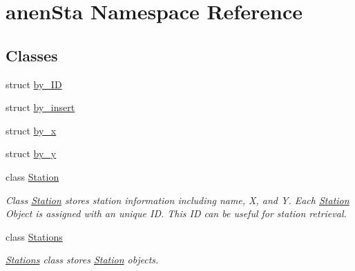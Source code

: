 \hypertarget{namespaceanen_sta}{}\section{anen\+Sta Namespace Reference}
\label{namespaceanen_sta}
\subsection*{Classes}
\begin{DoxyCompactItemize}
\item 
struct \mbox{\hyperlink{structanen_sta_1_1by___i_d}{by\+\_\+\+ID}}
\item 
struct \mbox{\hyperlink{structanen_sta_1_1by__insert}{by\+\_\+insert}}
\item 
struct \mbox{\hyperlink{structanen_sta_1_1by__x}{by\+\_\+x}}
\item 
struct \mbox{\hyperlink{structanen_sta_1_1by__y}{by\+\_\+y}}
\item 
class \mbox{\hyperlink{classanen_sta_1_1_station}{Station}}
\begin{DoxyCompactList}\small\item\em Class \mbox{\hyperlink{classanen_sta_1_1_station}{Station}} stores station information including name, X, and Y. Each \mbox{\hyperlink{classanen_sta_1_1_station}{Station}} Object is assigned with an unique ID. This ID can be useful for station retrieval. \end{DoxyCompactList}\item 
class \mbox{\hyperlink{classanen_sta_1_1_stations}{Stations}}
\begin{DoxyCompactList}\small\item\em \mbox{\hyperlink{classanen_sta_1_1_stations}{Stations}} class stores \mbox{\hyperlink{classanen_sta_1_1_station}{Station}} objects. \end{DoxyCompactList}\end{DoxyCompactItemize}
